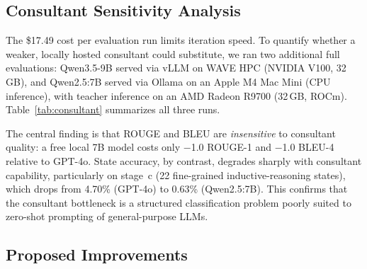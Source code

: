 \documentclass[11pt]{article}
\begin{document}
\subsection{Consultant Sensitivity Analysis}

The \$17.49 cost per evaluation run limits iteration speed. To quantify whether a weaker, locally hosted consultant could substitute, we ran two additional full evaluations: Qwen3.5-9B served via vLLM on WAVE HPC (NVIDIA V100, 32\,GB), and Qwen2.5:7B served via Ollama on an Apple M4 Mac Mini (CPU inference), with teacher inference on an AMD Radeon R9700 (32\,GB, ROCm). Table~\ref{tab:consultant} summarizes all three runs.

\begin{table}[t]
  \centering
  \small
  \caption{Consultant sensitivity across the 681-dialogue test split. ROUGE/BLEU varies by at most 1.0 R-1 across all runs, while state accuracy drops 11 points as consultant capability decreases from GPT-4o to Qwen2.5:7B. Text-overlap is driven by the fixed SocratTeachLLM teacher; state accuracy is the consultant-sensitive signal.}
  \label{tab:consultant}
\end{table}

The central finding is that ROUGE and BLEU are \emph{insensitive} to consultant quality: a free local 7B model costs only $-$1.0 ROUGE-1 and $-$1.0 BLEU-4 relative to GPT-4o. State accuracy, by contrast, degrades sharply with consultant capability, particularly on stage~c (22 fine-grained inductive-reasoning states), which drops from 4.70\% (GPT-4o) to 0.63\% (Qwen2.5:7B). This confirms that the consultant bottleneck is a structured classification problem poorly suited to zero-shot prompting of general-purpose LLMs.

\subsection{Proposed Improvements}
\end{document}
